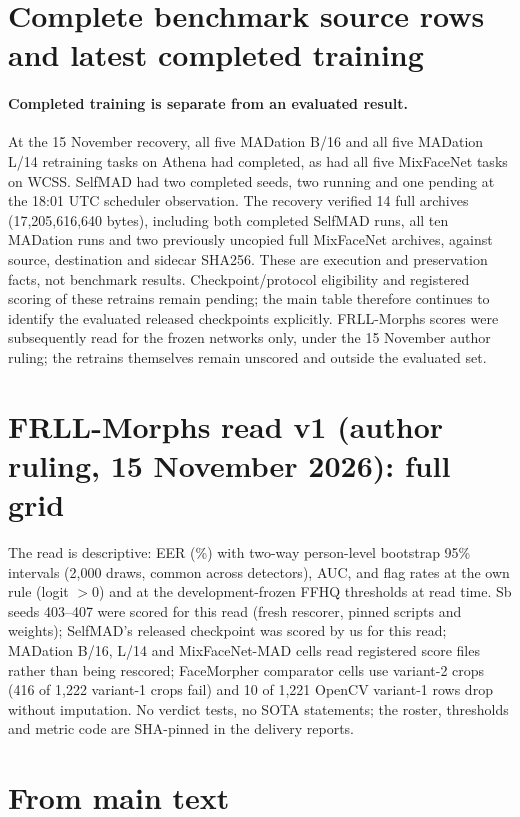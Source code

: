 \documentclass[10pt,twocolumn,letterpaper]{article}
\begin{document}
\section{Complete benchmark source rows and latest completed training}

\paragraph{Completed training is separate from an evaluated result.}
At the 15 November recovery, all five MADation B/16 and all five MADation L/14 retraining tasks on Athena had completed, as had all five MixFaceNet tasks on WCSS. SelfMAD had two completed seeds, two running and one pending at the 18:01 UTC scheduler observation. The recovery verified 14 full archives (17,205,616,640 bytes), including both completed SelfMAD runs, all ten MADation runs and two previously uncopied full MixFaceNet archives, against source, destination and sidecar SHA256. These are execution and preservation facts, not benchmark results. Checkpoint/protocol eligibility and registered scoring of these retrains remain pending; the main table therefore continues to identify the evaluated released checkpoints explicitly. FRLL-Morphs scores were subsequently read for the frozen networks only, under the 15 November author ruling; the retrains themselves remain unscored and outside the evaluated set.

\section{FRLL-Morphs read v1 (author ruling, 15 November 2026): full grid}
The read is descriptive: EER (\%) with two-way person-level bootstrap 95\% intervals (2,000 draws, common across detectors), AUC, and flag rates at the own rule (logit $>0$) and at the development-frozen FFHQ thresholds at read time. Sb seeds 403--407 were scored for this read (fresh rescorer, pinned scripts and weights); SelfMAD's released checkpoint was scored by us for this read; MADation B/16, L/14 and MixFaceNet-MAD cells read registered score files rather than being rescored; FaceMorpher comparator cells use variant-2 crops (416 of 1,222 variant-1 crops fail) and 10 of 1,221 OpenCV variant-1 rows drop without imputation. No verdict tests, no SOTA statements; the roster, thresholds and metric code are SHA-pinned in the delivery reports.




\section{From main text}
\end{document}
